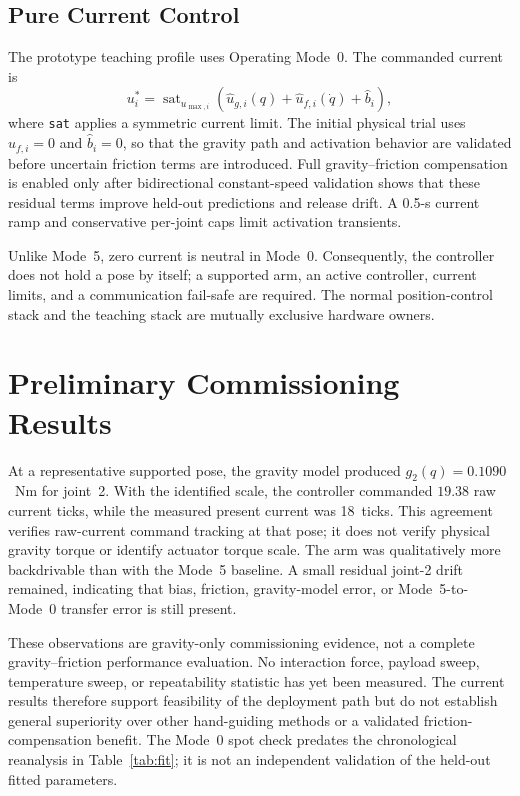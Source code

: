 \documentclass[conference]{IEEEtran}
\begin{document}
\subsection{Pure Current Control}
The prototype teaching profile uses Operating Mode~0. The commanded current is
\begin{equation}
 u_i^{*}=\operatorname{sat}_{u_{\max,i}}
 \left(\hat u_{g,i}(q)+\hat u_{f,i}(\dot{q})+\hat b_i\right),
 \label{eq:command}
\end{equation}
where \texttt{sat} applies a symmetric current limit. The initial physical
trial uses $\hat u_{f,i}=0$ and $\hat b_i=0$, so that the gravity path and
activation behavior are validated before uncertain friction terms are
introduced. Full gravity--friction compensation is enabled only after
bidirectional constant-speed validation shows that these residual terms improve
held-out predictions and release drift. A 0.5-s current ramp and conservative
per-joint caps limit activation transients.

Unlike Mode~5, zero current is neutral in Mode~0. Consequently, the controller
does not hold a pose by itself; a supported arm, an active controller, current
limits, and a communication fail-safe are required. The normal position-control
stack and the teaching stack are mutually exclusive hardware owners.

\section{Preliminary Commissioning Results}
\label{sec:commissioning}
At a representative supported pose, the gravity model produced
$g_2(q)=0.1090$~Nm for joint~2. With the identified scale, the controller
commanded $19.38$ raw current ticks, while the measured present current was
18~ticks. This agreement verifies raw-current command tracking at that pose; it
does not verify physical gravity torque or identify actuator torque scale. The
arm was qualitatively more backdrivable than with the Mode~5 baseline. A small
residual joint-2 drift remained, indicating that bias, friction, gravity-model
error, or Mode~5-to-Mode~0 transfer error is still present.

These observations are gravity-only commissioning evidence, not a complete
gravity--friction performance evaluation. No interaction force, payload sweep,
temperature sweep, or repeatability statistic has yet been measured. The
current results therefore support feasibility of the deployment path but do not
establish general superiority over other hand-guiding methods or a validated
friction-compensation benefit. The Mode~0 spot check predates the chronological
reanalysis in Table~\ref{tab:fit}; it is not an independent validation of the
held-out fitted parameters.
\end{document}
